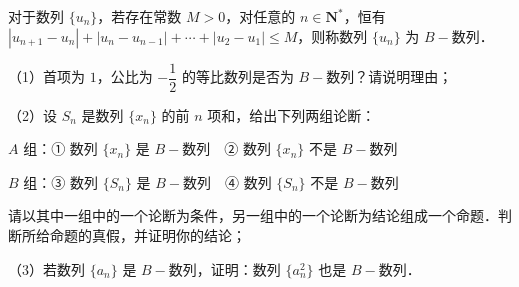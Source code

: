 \begin{question}
对于数列 $\{u_n\}$，若存在常数 $M>0$，对任意的 $n\in\mathbf N^*$，恒有 $|u_{n+1}-u_n|+|u_n-u_{n-1}|+\cdots+|u_2-u_1|\leqslant M$，则称数列 $\{u_n\}$ 为 $B-$数列．

（1）首项为 $1$，公比为 $-\dfrac12$ 的等比数列是否为 $B-$数列？请说明理由；

（2）设 $S_n$ 是数列 $\{x_n\}$ 的前 $n$ 项和，给出下列两组论断：

$A$ 组：① 数列 $\{x_n\}$ 是 $B-$数列　② 数列 $\{x_n\}$ 不是 $B-$数列

$B$ 组：③ 数列 $\{S_n\}$ 是 $B-$数列　④ 数列 $\{S_n\}$ 不是 $B-$数列

请以其中一组中的一个论断为条件，另一组中的一个论断为结论组成一个命题．判断所给命题的真假，并证明你的结论；

（3）若数列 $\{a_n\}$ 是 $B-$数列，证明：数列 $\{a_n^2\}$ 也是 $B-$数列．

\end{question}